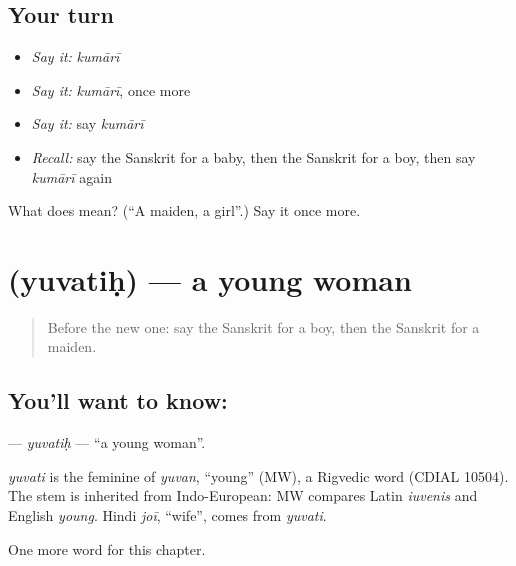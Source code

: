 \subsection*{Your turn}
\begin{itemize}
\raggedright
  \item \emph{Say it:} \emph{kumārī}
  \item \emph{Say it:} \emph{kumārī}, once more
  \item \emph{Say it:} say \emph{kumārī}
  \item \emph{Recall:} say the Sanskrit for a baby, then the Sanskrit for a boy, then say \emph{kumārī} again
\end{itemize}

\begin{tcolorbox}[breakable,colback=teal!4,colframe=teal!35!black,title={Before you move on}]
What does  mean? (\textquotedblleft{}A maiden, a girl\textquotedblright{}.) Say it once more.
\end{tcolorbox}
\section[\texorpdfstring{\sk{युवतिः} (yuvatiḥ)}{युवतिः (yuvatiḥ)}]{ (yuvatiḥ) — a young woman}

\label{lesson:SA-C236-yuvatih}



\begin{quote}
Before the new one: say the Sanskrit for a boy, then the Sanskrit for a maiden.
\end{quote}

\subsection*{You'll want to know: }
\textbf{} — \emph{yuvatiḥ} — \textquotedblleft{}a young woman\textquotedblright{}.

\begin{cousinweb}
\emph{yuvati} is the feminine of \emph{yuvan}, \textquotedblleft{}young\textquotedblright{} (MW), a Rigvedic word (CDIAL 10504). The stem is inherited from Indo-European: MW compares Latin \emph{iuvenis} and English \emph{young}. Hindi \emph{joī}, \textquotedblleft{}wife\textquotedblright{}, comes from \emph{yuvati}.
\end{cousinweb}

\begin{grammarlens}[title={What you've built}]
One more word for this chapter.
\end{grammarlens}

